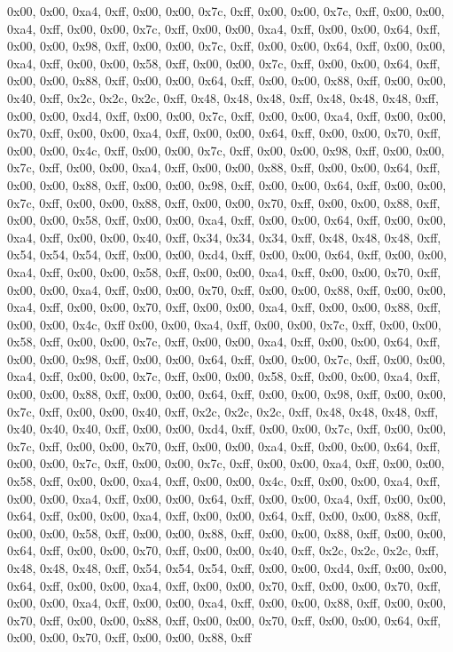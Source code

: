 0x00, 0x00, 0xa4, 0xff, 0x00, 0x00, 0x7c, 0xff, 0x00, 0x00, 0x7c, 0xff, 0x00, 0x00, 0xa4, 0xff, 0x00, 0x00, 0x7c, 0xff, 0x00, 0x00, 0xa4, 0xff, 0x00, 0x00, 0x64, 0xff, 0x00, 0x00, 0x98, 0xff, 0x00, 0x00, 0x7c, 0xff, 0x00, 0x00, 0x64, 0xff, 0x00, 0x00, 0xa4, 0xff, 0x00, 0x00, 0x58, 0xff, 0x00, 0x00, 0x7c, 0xff, 0x00, 0x00, 0x64, 0xff, 0x00, 0x00, 0x88, 0xff, 0x00, 0x00, 0x64, 0xff, 0x00, 0x00, 0x88, 0xff, 0x00, 0x00, 0x40, 0xff, 0x2c, 0x2c, 0x2c, 0xff, 0x48, 0x48, 0x48, 0xff, 0x48, 0x48, 0x48, 0xff, 0x00, 0x00, 0xd4, 0xff, 0x00, 0x00, 0x7c, 0xff, 0x00, 0x00, 0xa4, 0xff, 0x00, 0x00, 0x70, 0xff, 0x00, 0x00, 0xa4, 0xff, 0x00, 0x00, 0x64, 0xff, 0x00, 0x00, 0x70, 0xff, 0x00, 0x00, 0x4c, 0xff, 0x00, 0x00, 0x7c, 0xff, 0x00, 0x00, 0x98, 0xff, 0x00, 0x00, 0x7c, 0xff, 0x00, 0x00, 0xa4, 0xff, 0x00, 0x00, 0x88, 0xff, 0x00, 0x00, 0x64, 0xff, 0x00, 0x00, 0x88, 0xff, 0x00, 0x00, 0x98, 0xff, 0x00, 0x00, 0x64, 0xff, 0x00, 0x00, 0x7c, 0xff, 0x00, 0x00, 0x88, 0xff, 0x00, 0x00, 0x70, 0xff, 0x00, 0x00, 0x88, 0xff, 0x00, 0x00, 0x58, 0xff, 0x00, 0x00, 0xa4, 0xff, 0x00, 0x00, 0x64, 0xff, 0x00, 0x00, 0xa4, 0xff, 0x00, 0x00, 0x40, 0xff, 0x34, 0x34, 0x34, 0xff, 0x48, 0x48, 0x48, 0xff, 0x54, 0x54, 0x54, 0xff, 0x00, 0x00, 0xd4, 0xff, 0x00, 0x00, 0x64, 0xff, 0x00, 0x00, 0xa4, 0xff, 0x00, 0x00, 0x58, 0xff, 0x00, 0x00, 0xa4, 0xff, 0x00, 0x00, 0x70, 0xff, 0x00, 0x00, 0xa4, 0xff, 0x00, 0x00, 0x70, 0xff, 0x00, 0x00, 0x88, 0xff, 0x00, 0x00, 0xa4, 0xff, 0x00, 0x00, 0x70, 0xff, 0x00, 0x00, 0xa4, 0xff, 0x00, 0x00, 0x88, 0xff, 0x00, 0x00, 0x4c, 0xff
0x00, 0x00, 0xa4, 0xff, 0x00, 0x00, 0x7c, 0xff, 0x00, 0x00, 0x58, 0xff, 0x00, 0x00, 0x7c, 0xff, 0x00, 0x00, 0xa4, 0xff, 0x00, 0x00, 0x64, 0xff, 0x00, 0x00, 0x98, 0xff, 0x00, 0x00, 0x64, 0xff, 0x00, 0x00, 0x7c, 0xff, 0x00, 0x00, 0xa4, 0xff, 0x00, 0x00, 0x7c, 0xff, 0x00, 0x00, 0x58, 0xff, 0x00, 0x00, 0xa4, 0xff, 0x00, 0x00, 0x88, 0xff, 0x00, 0x00, 0x64, 0xff, 0x00, 0x00, 0x98, 0xff, 0x00, 0x00, 0x7c, 0xff, 0x00, 0x00, 0x40, 0xff, 0x2c, 0x2c, 0x2c, 0xff, 0x48, 0x48, 0x48, 0xff, 0x40, 0x40, 0x40, 0xff, 0x00, 0x00, 0xd4, 0xff, 0x00, 0x00, 0x7c, 0xff, 0x00, 0x00, 0x7c, 0xff, 0x00, 0x00, 0x70, 0xff, 0x00, 0x00, 0xa4, 0xff, 0x00, 0x00, 0x64, 0xff, 0x00, 0x00, 0x7c, 0xff, 0x00, 0x00, 0x7c, 0xff, 0x00, 0x00, 0xa4, 0xff, 0x00, 0x00, 0x58, 0xff, 0x00, 0x00, 0xa4, 0xff, 0x00, 0x00, 0x4c, 0xff, 0x00, 0x00, 0xa4, 0xff, 0x00, 0x00, 0xa4, 0xff, 0x00, 0x00, 0x64, 0xff, 0x00, 0x00, 0xa4, 0xff, 0x00, 0x00, 0x64, 0xff, 0x00, 0x00, 0xa4, 0xff, 0x00, 0x00, 0x64, 0xff, 0x00, 0x00, 0x88, 0xff, 0x00, 0x00, 0x58, 0xff, 0x00, 0x00, 0x88, 0xff, 0x00, 0x00, 0x88, 0xff, 0x00, 0x00, 0x64, 0xff, 0x00, 0x00, 0x70, 0xff, 0x00, 0x00, 0x40, 0xff, 0x2c, 0x2c, 0x2c, 0xff, 0x48, 0x48, 0x48, 0xff, 0x54, 0x54, 0x54, 0xff, 0x00, 0x00, 0xd4, 0xff, 0x00, 0x00, 0x64, 0xff, 0x00, 0x00, 0xa4, 0xff, 0x00, 0x00, 0x70, 0xff, 0x00, 0x00, 0x70, 0xff, 0x00, 0x00, 0xa4, 0xff, 0x00, 0x00, 0xa4, 0xff, 0x00, 0x00, 0x88, 0xff, 0x00, 0x00, 0x70, 0xff, 0x00, 0x00, 0x88, 0xff, 0x00, 0x00, 0x70, 0xff, 0x00, 0x00, 0x64, 0xff, 0x00, 0x00, 0x70, 0xff, 0x00, 0x00, 0x88, 0xff
